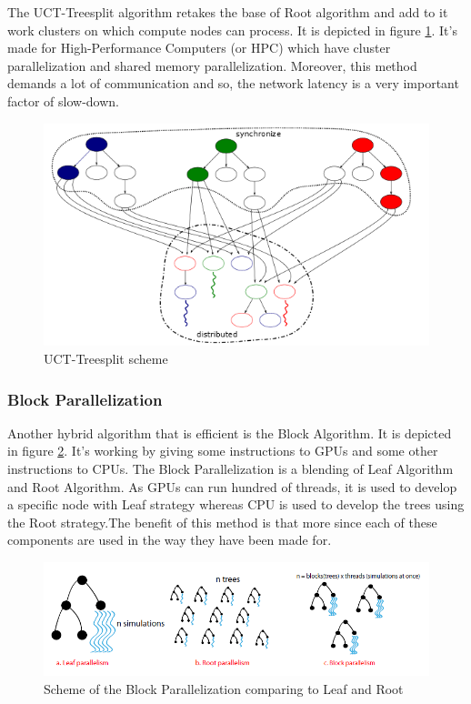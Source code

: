 The UCT-Treesplit algorithm\cite{treesplit} retakes the base of Root algorithm and add to it work clusters on which compute nodes can process. It is depicted in figure \ref{treesplit}. It’s made for High-Performance Computers (or HPC) which have cluster parallelization and shared memory parallelization. Moreover, this method demands a lot of communication and so, the network latency is a very important factor of slow-down.

\begin{figure}[!h] 
\centerline{\includegraphics[scale=0.60]{2_State_of_the_art/Strategy_of_root_parallelization_Mikail/treesplit.png}}
   \caption{\label{étiquette} UCT-Treesplit scheme}
\label{treesplit}
\end{figure}

\subsubsection{Block Parallelization}

Another hybrid algorithm that is efficient is the Block Algorithm\cite{GPU}.  It is depicted in figure \ref{block}. It's working by giving some instructions to GPUs and some other instructions to CPUs. The Block Parallelization is a blending of Leaf Algorithm and Root Algorithm. As GPUs can run hundred of threads, it is used to develop a specific node with Leaf strategy whereas CPU is used to develop the trees using the Root strategy.The benefit of this method is that more since each of these components are used in the way they have been made for.

\begin{figure}[!h] 
\centerline{\includegraphics[scale=0.60]{2_State_of_the_art/Strategy_of_root_parallelization_Mikail/block.png}}
   \caption{\label{étiquette} Scheme of the Block Parallelization comparing to Leaf and Root}
\label{block}
\end{figure}

